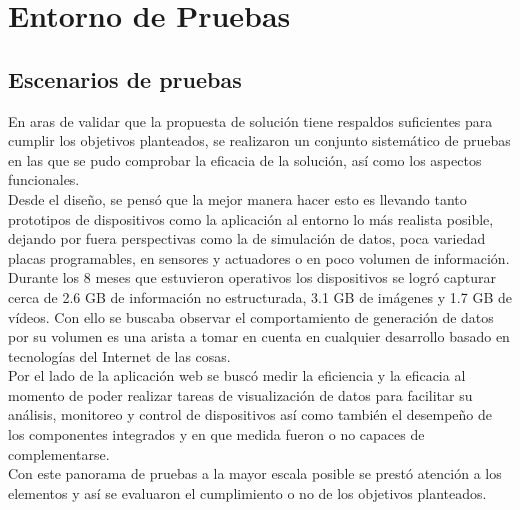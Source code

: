 

\chapter{ Entorno de Pruebas}
\section{Escenarios de pruebas}
En aras de validar que la propuesta de solución tiene respaldos suficientes para cumplir los objetivos planteados, se realizaron un conjunto sistemático de pruebas en las que se pudo comprobar la eficacia de la solución, así como los aspectos funcionales.\\

Desde el diseño, se pensó que la mejor manera hacer esto es llevando tanto prototipos de dispositivos como la aplicación al entorno lo más realista posible, dejando por fuera perspectivas como la de simulación de datos, poca variedad placas programables, en sensores y actuadores o en poco volumen de información.\\

Durante los 8 meses que estuvieron operativos los dispositivos se logró capturar cerca de 2.6 GB de información no estructurada, 3.1 GB de imágenes y 1.7 GB de vídeos. Con ello se buscaba observar el comportamiento de generación de datos por su volumen es una arista a tomar en cuenta en cualquier desarrollo basado en tecnologías del Internet de las cosas.\\

Por el lado de la aplicación web se buscó medir la eficiencia y la eficacia al momento de poder realizar tareas de visualización de datos para facilitar su análisis, monitoreo y control de dispositivos así como también el desempeño de los componentes integrados y en que medida fueron o no capaces de complementarse.\\

Con este panorama de pruebas a la mayor escala posible se prestó atención a los elementos y así se evaluaron el cumplimiento o no de los objetivos planteados. 


